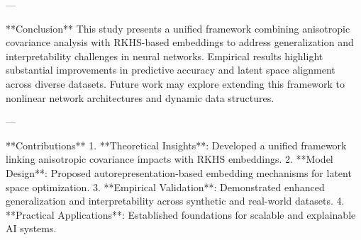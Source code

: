 ---

**Conclusion**  
This study presents a unified framework combining anisotropic covariance analysis with RKHS-based embeddings to address generalization and interpretability challenges in neural networks. Empirical results highlight substantial improvements in predictive accuracy and latent space alignment across diverse datasets. Future work may explore extending this framework to nonlinear network architectures and dynamic data structures.

---

**Contributions**  
1. **Theoretical Insights**: Developed a unified framework linking anisotropic covariance impacts with RKHS embeddings.  
2. **Model Design**: Proposed autorepresentation-based embedding mechanisms for latent space optimization.  
3. **Empirical Validation**: Demonstrated enhanced generalization and interpretability across synthetic and real-world datasets.  
4. **Practical Applications**: Established foundations for scalable and explainable AI systems.